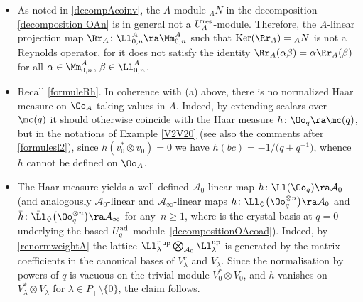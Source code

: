 \begin{Remark}\label{noHaarRoverA}\quad
\begin{itemize}\itemsep=0pt
\item[$(a)$] As noted in \eqref{decompAcoinv}, the $A$-module ${}_AN$ in the decomposition \eqref{decomposition OAn} is in general not a $U_A^{\rm res}$-module. Therefore, the $A$-linear projection map $\Rr_A\colon \Ll_{0,n}^A\ra \Mm_{0,n}^A$ such that ${\rm Ker}(\Rr_A)={}_AN$ is not a Reynolds operator, for it does not satisfy the identity $\Rr_A(\alpha \beta) = \alpha \Rr_A(\beta)$ for all $\alpha\in \Mm_{0,n}^A$, $\beta \in \Ll_{0,n}^A$.

\item[$(b)$] Recall \eqref{formuleRh}. In coherence with (a) above, there is no normalized Haar measure on $\Oo_A$ taking values in $A$. Indeed, by extending scalars over $\mc(q)$ it should otherwise coincide with the Haar measure $h\colon \Oo_q \ra \mc(q)$, but in the notations of Example \ref{V2V20} (see also the comments after \eqref{formulesl2}), since $h(v_0^* \otimes v_0)=0$ we have $h(bc)=-1/\big(q+q^{-1}\big)$, whence $h$ cannot be defined on $\Oo_A$.

\item[$(c)$] The Haar measure yields a well-defined $\mathcal{A}_0$-linear map $h\colon \Ll(\Oo_q) \ra \mathcal{A}_0$ (and analogously $\mathcal{A}_0$-linear and $\mathcal{A}_\infty$-linear maps $h\colon \Ll_{\lozenge}\big(\Oo_q^{\otimes n}\big) \ra \mathcal{A}_0$ and $\bar{h}\colon \bar{\Ll}_{\lozenge}\big(\Oo_q^{\otimes n}\big) \ra \mathcal{A}_\infty$ for any~$n\geq 1$, where  is the crystal basis at $q=0$ underlying the based $U_q^{\rm ad}$-module~\eqref{decompositionOAcoad}). Indeed, by \eqref{renormweightA} the lattice $\Ll_{\lambda}^r {}^{\rm up} \bigotimes_{\mathcal{A}_0} \Ll_{\lambda}^{\rm up}$ is generated by the matrix coefficients in the canonical bases of $V_\lambda^r$ and $V_\lambda$. Since the normalisation by powers of $q$ is vacuous on the trivial module $V_0^* \otimes V_0$, and $h$ vanishes on $V_\lambda^* \otimes V_\lambda$ for $\lambda \in P_+\setminus \{0\}$, the claim follows.
 \end{itemize}
\end{Remark}

